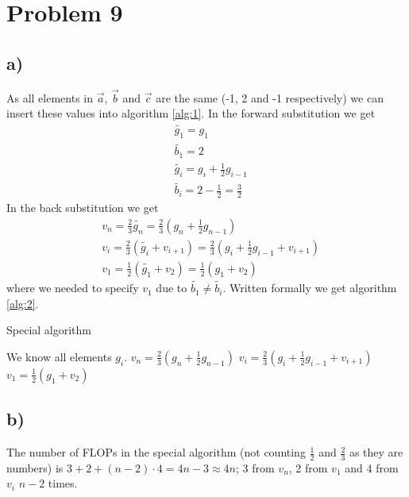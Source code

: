 \documentclass[english,notitlepage]{revtex4-2}  %
\begin{document}
\section*{Problem 9}
\subsection*{a)}
As all elements in $\vec{a}$, $\vec{b}$ and $\vec{c}$ are the same (-1, 2 and -1 respectively) we can insert these values into algorithm \ref{alg:1}. In the forward substitution we get 
\begin{equation}
	\begin{split}
		&\tilde{g_1} = g_1 \\
		&\tilde{b_1} = 2 \\
		&\tilde{g_i}=g_i+\frac{1}{2}g_{i-1} \\
		&\tilde{b_i}=2-\frac{1}{2}=\frac{3}{2}
	\end{split}
\end{equation}
In the back substitution we get 
\begin{equation}
	\begin{split}
		&v_n=\frac{2}{3}\tilde{g_n}=\frac{2}{3}(g_n+\frac{1}{2}g_{n-1}) \\
		&v_i=\frac{2}{3}(\tilde{g_i}+v_{i+1})=\frac{2}{3}(g_i+\frac{1}{2}g_{i-1}+v_{i+1}) \\
		&v_1=\frac{1}{2}(\tilde{g_1}+v_2)=\frac{1}{2}(g_1+v_2)
	\end{split}
\end{equation}
where we needed to specify $v_1$ due to $\tilde{b_1}\neq\tilde{b_i}$. Written formally we get algorithm \ref{alg:2}.
\begin{algorithm}[H]
	\caption{Special algorithm}
	\begin{algorithmic}
		\State We know all elements $g_i$.
		\State $v_n=\frac{2}{3}(g_n+\frac{1}{2}g_{n-1})$ 
		\State $v_i=\frac{2}{3}(g_i+\frac{1}{2}g_{i-1}+v_{i+1})$
		\EndFor
		\State $v_1=\frac{1}{2}(g_1+v_2)$
	\end{algorithmic}
	\label{alg:2}
\end{algorithm}

\subsection*{b)}
The number of FLOPs in the special algorithm (not counting $\frac{1}{2}$ and $\frac{2}{3}$ as they are numbers) is $3+2+(n-2)\cdot4=4n-3\approx4n$; 3 from $v_n$, 2 from $v_1$ and 4 from $v_i$ $n-2$ times. 
\end{document}
